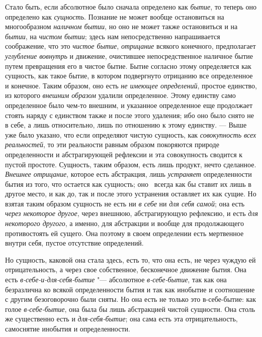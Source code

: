 Стало быть, если абсолютное было сначала определено как
{\em бытие}, то теперь оно определено как
{\em сущность}. Познание не может вообще остановиться
на многообразном {\em наличном бытии}, но оно не может
также остановиться и на {\em бытии}, на
{\em чистом бытии}; здесь нам непосредственно
напрашивается соображение, что это {\em чистое бытие},
{\em отрицание} всякого конечного, предполагает
{\em углубление вовнутрь} и движение, очистившее
непосредственное наличное бытие путем превращения его в чистое бытие. Бытие
согласно этому определяется как сущность, как такое бытие, в котором
подвергнуто отрицанию все определенное и конечное. Таким образом, оно есть
{\em не имеющее определений}, простое единство, из
которого {\em внешним образом} удалили определенное.
Этому единству само определенное было чем-то внешним, и указанное
определенное еще продолжает стоять наряду с единством также и после этого
удаления; ибо оно было снято не в себе, а лишь относительно, лишь по
отношению к этому единству. --- Выше~
уже было указано, что если определяют чистую сущность, как
{\em совокупность всех реальностей}, то эти реальности
равным образом покоряются природе определенности и абстрагирующей рефлексии
и эта совокупность сводится к пустой простоте. Сущность, таким образом,
есть лишь продукт, нечто сделанное. {\em Внешнее
отрицание}, которое есть абстракция, лишь
{\em устраняет} определенности бытия из того, что
остается как сущность;
оно~
всегда как бы ставит их лишь в другое место, и как до, так и после этого
устранения оставляет их как сущие. Но взятая таким образом сущность не есть
ни {\em в себе} ни {\em для себя
самой}; она есть {\em через некоторое другое}, через
внешнюю, абстрагирующую рефлексию, и есть {\em для
некоторого другого}, а именно, для абстракции и вообще для продолжающего
противостоять ей сущего. Она поэтому в своем определении есть мертвенное
внутри себя, пустое отсутствие определений.

Но сущность, каковой она стала здесь, есть то, что она есть, не через чуждую
ей отрицательность, а через свое собственное, бесконечное движение бытия.
Она есть {\em в-себе-и-для-себя-бытие} "--- абсолютное
{\em в-себе-бытие}, так как она безразлична ко всякой
определенности бытия и так как инобытие и соотношение с другим
безоговорочно были сняты. Но она есть не только это в-себе-бытие: как голое
{\em в-себе-бытие}, она была бы лишь абстракцией чистой
сущности. Она столь же существенно есть и
{\em для-себя-бытие}; она сама есть эта
отрицательность, самоснятие инобытия и определенности.

